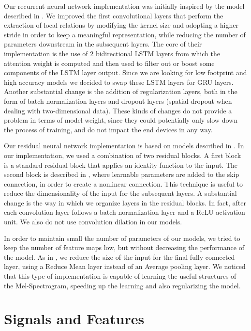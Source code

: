 Our recurrent neural network implementation was initially inspired by the model described in \cite{1}. 
We improved the first convolutional layers that perform the extraction of local relations by modifying the kernel size and adopting a higher stride in order to keep a meaningful representation, while reducing the number of parameters downstream in the subsequent layers. The core of their implementation is the use of 2 bidirectional LSTM layers from which the attention weight is computed and then used to filter out or boost some components of the LSTM layer output.
Since we are looking for low footprint and high accuracy models we decided to swap these LSTM layers for GRU layers.
Another substantial change is the addition of regularization layers, both in the form of batch normalization layers and dropout layers (spatial dropout when dealing with two-dimensional data). These kinds of changes do not provide a problem in terms of model weight, since they could potentially only slow down the process of training, and do not impact the end devices in any way.


Our residual neural network implementation is based on models described in \cite{2}.
In our implementation, we used a combination of two residual blocks. A first block is a standard residual block that applies an identity function to the input. The second block is described in \cite{14}, where learnable parameters are added to the skip connection, in order to create a nonlinear connection. This technique is useful to reduce the dimensionality of the input for the subsequent layers.
A substantial change is the way in which we organize layers in the residual blocks. In fact, after each convolution layer follows a batch normalization layer and a ReLU activation unit. We also do not use convolution dilation in our models.


In order to maintain small the number of parameters of our models, we tried to keep the number of feature maps low, but without decreasing the performance of the model.
As in \cite{2}, we reduce the size of the input for the final fully connected layer, using a Reduce Mean layer instead of an Average pooling layer.
We noticed that this type of implementation is capable of learning the useful structures of the Mel-Spectrogram, speeding up the learning and also regularizing the model.

\section{Signals and Features}
\label{sec:model}


